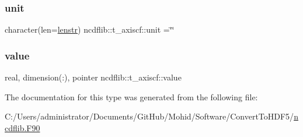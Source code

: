 \mbox{\label{structncdflib_1_1t__axiscf_aa9c3b79b06d7698e0cfec143deef7ee1}} 
\subsubsection{\texorpdfstring{unit}{unit}}
{\footnotesize\ttfamily character(len=\mbox{\hyperlink{namespacencdflib_a7d52315e1d9f473093f6f8fa245ea084}{lenstr}}) ncdflib\+::t\+\_\+axiscf\+::unit =\char`\"{}\char`\"{}\hspace{0.3cm}{\ttfamily [private]}}

\mbox{\label{structncdflib_1_1t__axiscf_abae2dffd9b0944590c75efc38e700e97}} 
\subsubsection{\texorpdfstring{value}{value}}
{\footnotesize\ttfamily real, dimension(\+:), pointer ncdflib\+::t\+\_\+axiscf\+::value\hspace{0.3cm}{\ttfamily [private]}}



The documentation for this type was generated from the following file\+:\begin{DoxyCompactItemize}
\item 
C\+:/\+Users/administrator/\+Documents/\+Git\+Hub/\+Mohid/\+Software/\+Convert\+To\+H\+D\+F5/\mbox{\hyperlink{ncdflib_8_f90}{ncdflib.\+F90}}\end{DoxyCompactItemize}
